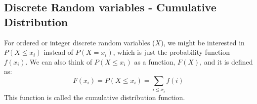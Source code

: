 \documentclass[11pt]{article}
\begin{document}
	\subsection*{Discrete Random variables - Cumulative Distribution}
	For ordered or integer discrete random variables ($X$), we might be interested in $P(X \leq x_i)$ instead of $P(X=x_i)$, which is just the probability function $f(x_i)$. We can also think of $P(X \leq x_i)$ as a function, $F(X)$, and it is defined as:
	\[F(x_i) = P(X \leq x_i) =  \sum\limits_{i\leq x_i} f(i)\]
	This function is called the cumulative distribution function.
\end{document}
